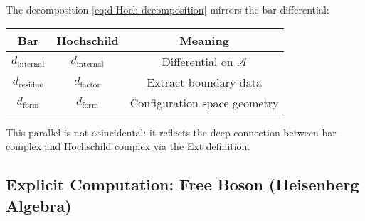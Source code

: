 \begin{remark}
The decomposition \eqref{eq:d-Hoch-decomposition} mirrors the bar differential:

\begin{center}
\begin{tabular}{c|c|c}
\textbf{Bar} & \textbf{Hochschild} & \textbf{Meaning} \\
\hline
$d_{\text{internal}}$ & $d_{\text{internal}}$ & Differential on $\mathcal{A}$ \\
$d_{\text{residue}}$ & $d_{\text{factor}}$ & Extract boundary data \\
$d_{\text{form}}$ & $d_{\text{form}}$ & Configuration space geometry \\
\end{tabular}
\end{center}

This parallel is not coincidental: it reflects the deep connection between bar complex
and Hochschild complex via the Ext definition.
\end{remark}

\subsection{Explicit Computation: Free Boson (Heisenberg Algebra)}

